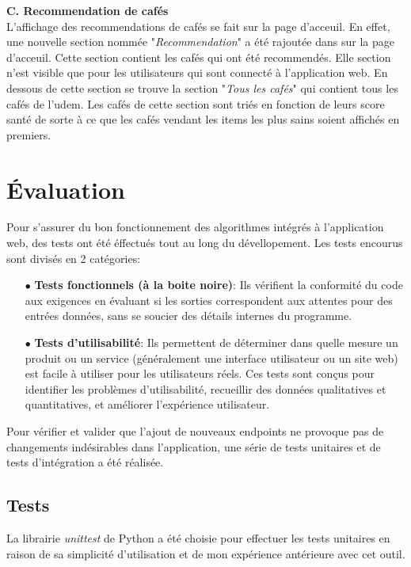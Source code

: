 \documentclass[11pt]{article}
\begin{document}
\textbf{C. Recommendation de cafés}\\
L'affichage des recommendations de cafés se fait sur la page d'acceuil. En effet, une nouvelle section nommée "\textit{Recommendation}" a été rajoutée dans sur la page d'acceuil. Cette section contient les cafés qui ont été recommendés. Elle section n'est visible que pour les utilisateurs qui sont connecté à l'application web. En dessous de cette section se trouve la section "\textit{Tous les cafés}" qui contient tous les cafés de l'udem. Les cafés de cette section sont triés en fonction de leurs score santé de sorte à ce que les cafés vendant les items les plus sains soient affichés en premiers.\\

\newpage


\section{Évaluation}
Pour s'assurer du bon fonctionnement des algorithmes intégrés à l'application web, des tests ont été éffectués tout au long du dévellopement. Les tests encourus sont divisés en 2 catégories:\\

\begin{itemize}
	\item[$\bullet$] \textbf{Tests fonctionnels (à la boite noire)}: Ils vérifient la conformité du code aux exigences en évaluant si les sorties correspondent aux attentes pour des entrées données, sans se soucier des détails internes du programme.\\
	
	\item[$\bullet$] \textbf{Tests d'utilisabilité}: Ils permettent de déterminer dans quelle mesure un produit ou un service (généralement une interface utilisateur ou un site web) est facile à utiliser pour les utilisateurs réels. Ces tests sont conçus pour identifier les problèmes d'utilisabilité, recueillir des données qualitatives et quantitatives, et améliorer l'expérience utilisateur.\\
\end{itemize}

Pour vérifier et valider que l'ajout de nouveaux endpoints ne provoque pas de changements indésirables dans l'application, une série de tests unitaires et de tests d'intégration a été réalisée.

\subsection{Tests}
La librairie \textit{unittest} de Python a été choisie pour effectuer les tests unitaires en raison de sa simplicité d'utilisation et de mon expérience antérieure avec cet outil.
\end{document}
